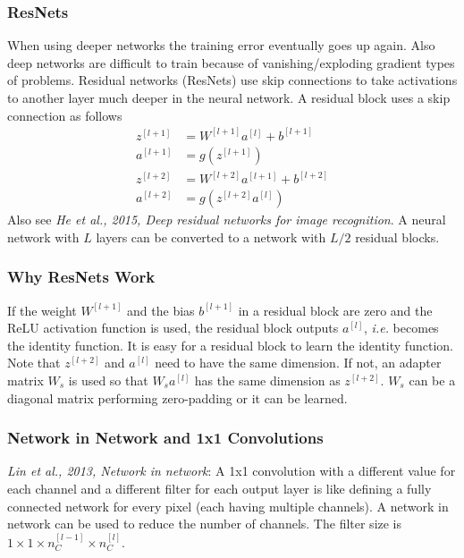 \documentclass{article}
\begin{document}
\subsubsection{ResNets}
When using deeper networks the training error eventually goes up again.
Also deep networks are difficult to train because of vanishing/exploding gradient types of problems.
Residual networks (ResNets) use skip connections to take activations to another layer much deeper in the neural network.
A residual block uses a skip connection as follows
\begin{equation}
  \begin{split}
    z^{[l+1]}&=W^{[l+1]}a^{[l]}+b^{[l+1]}\\
    a^{[l+1]}&=g(z^{[l+1]})\\
    z^{[l+2]}&=W^{[l+2]}a^{[l+1]}+b^{[l+2]}\\
    a^{[l+2]}&=g(z^{[l+2]}a^{[l]})
  \end{split}
\end{equation}
Also see \emph{He et al., 2015, Deep residual networks for image recognition}.
A neural network with $L$ layers can be converted to a network with $L/2$ residual blocks.

\subsubsection{Why ResNets Work}
If the weight $W^{[l+1]}$ and the bias $b^{[l+1]}$ in a residual block are zero and the ReLU activation function is used,
the residual block outputs $a^{[l]}$, \emph{i.e.} becomes the identity function.
It is easy for a residual block to learn the identity function.
Note that $z^{[l+2]}$ and $a^{[l]}$ need to have the same dimension.
If not, an adapter matrix $W_s$ is used so that $W_s a^{[l]}$ has the same dimension as $z^{[l+2]}$.
$W_s$ can be a diagonal matrix performing zero-padding or it can be learned.

\subsubsection{Network in Network and 1x1 Convolutions}
\emph{Lin et al., 2013, Network in network}:
A 1x1 convolution with a different value for each channel and a different filter for each output layer
is like defining a fully connected network for every pixel (each having multiple channels).
A network in network can be used to reduce the number of channels.
The filter size is $1\times 1\times n^{[l-1]}_C\times n^{[l]}_C$.
\end{document}
